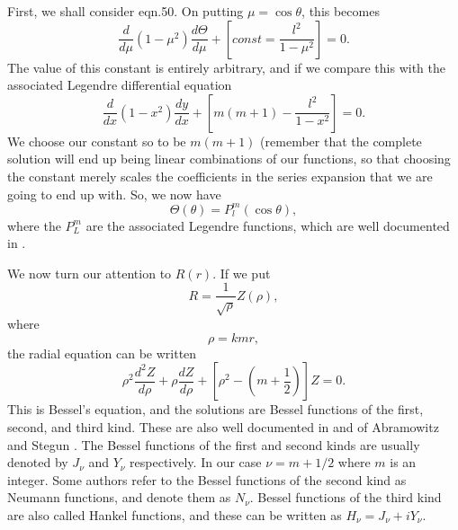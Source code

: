 \documentclass[12pt]{article}
\begin{document}
First, we shall consider eqn.50. On putting $\mu=\cos \theta$, this becomes
\begin{equation}
\frac{d}{ d \mu} (1-\mu^2) \frac{ d \Theta}{d \mu}
+ \left \lbrack const=\frac{l^2}{1 -\mu^2} \right \rbrack=0.
\end{equation}
The value of this constant is entirely arbitrary, and if we compare this with the associated Legendre differential equation \cite{AbramowitzStegun:Miebib}
\begin{equation}
\frac{d}{ d x} (1-x^2) \frac{ d y}{d x}
+ \left \lbrack m(m+1)-\frac{l^2}{1 -x^2} \right \rbrack=0.
\end{equation}
We choose our constant so to be $m(m+1)$ (remember that the complete solution will end up being linear combinations of our functions, so that choosing the constant merely scales the coefficients in the series expansion that we are going to end up with. So, we now have
\begin{equation}
\Theta(\theta)=P^m_l(\cos \theta),
\end{equation}
where the $P^m_L$ are the associated Legendre functions, which are well documented in \cite{AbramowitzStegun:Miebib}.

We now turn our attention to $R(r)$. If we put
\begin{equation}
R=\frac{1}{\sqrt{\rho}} Z(\rho), 
\end{equation}
where
\begin{equation}
\rho=kmr,
\end{equation}
the radial equation can be written
\begin{equation}
\rho^2 \frac{d^2 Z}{d \rho}
+\rho \frac{d Z}{d \rho}+
\left \lbrack \rho^2- \left ( m+\frac{1}{2} \right ) \right \rbrack Z=0.
\end{equation}
This is Bessel's equation, and the solutions are Bessel functions of
the first,  second, and third  kind. These are also well documented in
 and  of Abramowitz and Stegun 
\cite{AbramowitzStegun:Miebib}.
The Bessel functions of the first and second kinds are usually denoted by
$J_\nu$ and $Y_\nu$ respectively. In our case $\nu=m+1/2$ where $m$ is an integer. Some authors refer to the Bessel functions of the second kind as Neumann functions, and denote them as $N_\nu$. Bessel functions of the third kind are also
called Hankel functions, and these can be written as $H_\nu=J_\nu+i Y_\nu$.
\end{document}
